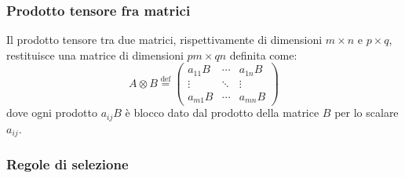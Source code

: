 \documentclass[11pt, a4paper]{scrartcl} %
\numberwithin{equation}{subsection}
\theoremstyle{style2}
\theoremstyle{style1}
\begin{document}
\subsubsection{Prodotto tensore fra matrici}
	Il prodotto tensore tra due matrici, rispettivamente di dimensioni $m \times n$ e $p \times q$, restituisce una matrice di dimensioni $pm  \times  qn$ definita come:
	\begin{equation}
		A \otimes B \overset{\text{def}}{=} \begin{pmatrix} a_{11} B & \cdots & a_{1n} B\\ \vdots & \ddots&\vdots \\ a_{m1}B & \cdots  & a_{mn} B\end{pmatrix} 
	\end{equation}
	dove ogni prodotto $a_{ij} B$ \`e blocco dato dal prodotto della matrice $B$ per lo scalare $a_{ij} $. 
\subsubsection{Regole di selezione}
\end{document}
